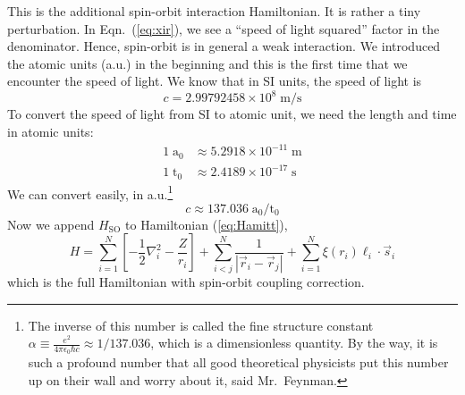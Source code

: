 This is the additional spin-orbit interaction Hamiltonian. It is rather a tiny
perturbation. In Eqn.~(\ref{eq:xir}), we see a ``speed of light squared''
factor in the denominator. Hence, spin-orbit is in general a weak interaction.
We introduced the atomic units (a.u.) in the beginning and this is the first time
that we encounter the speed of light. We know that in SI units, the speed of light is
\begin{equation} \label{eq:cSI}
c = 2.99792458\times10^8\;\mathrm{m}/\mathrm{s}
\end{equation}
%
To convert the speed of light from SI to atomic unit, we need the length and time
in atomic units:
\begin{align}
1\;\mathrm{a_0} & \approx 5.2918\times10^{-11}\;\mathrm{m}  \\
1\;\mathrm{t_0} & \approx 2.4189\times10^{-17}\;\mathrm{s}
\end{align}
%
We can convert easily, in a.u.\footnote{The inverse of this number is called the
fine structure constant $\alpha\equiv\frac{e^2}{4\pi\epsilon_0\hbar c}\approx 1/137.036$,
which is a dimensionless quantity. By the way, it is such a profound number that
all good theoretical physicists put this number up on their wall and worry about it,
said Mr.\ Feynman.}
\begin{equation} \label{eq:cau}
c \approx 137.036\;\mathrm{a_0}/\mathrm{t_0}
\end{equation}
%
Now we append $H_\text{SO}$ to Hamiltonian (\ref{eq:Hamitt}),
\begin{equation} \label{eq:HamitSO}
H = \sum_{i=1}^N \left[ -\frac{1}{2} \nabla_i^2 - \frac{Z}{r_i} \right] + \sum_{i<j}^N \frac{1}{|\vec{r}_i - \vec{r}_j|} + \sum_{i=1}^N \xi(r_i) \boldsymbol{\ell}_i\cdot\vec{s}_i
\end{equation}
which is the full Hamiltonian with spin-orbit coupling correction.

